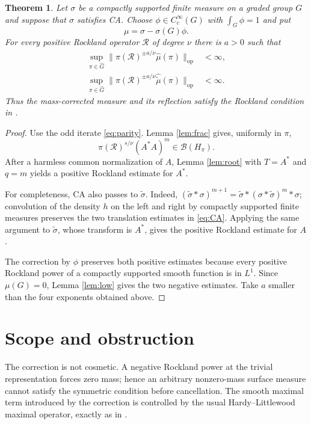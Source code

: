 \documentclass[11pt]{article}
\newtheorem{theorem}{Theorem}
\newcommand{\Rcal}{\mathcal R}
\newcommand{\wideG}{\widehat G}
\newcommand{\op}{\mathrm{op}}
\begin{document}
\begin{theorem}\label{thm:main}
Let $\sigma$ be a compactly supported finite measure on a graded group $G$
and suppose that $\sigma$ satisfies CA.  Choose
$\phi\in C_c^\infty(G)$ with $\int_G\phi=1$ and put
\[
 \mu=\sigma-\sigma(G)\phi.
\]
For every positive Rockland operator $\Rcal$ of degree $\nu$ there is $a>0$
such that
\begin{align*}
 \sup_{\pi\in\wideG}
 \|\pi(\Rcal)^{\pm a/\nu}\widehat\mu(\pi)\|_{\op}&<\infty,\\
 \sup_{\pi\in\wideG}
 \|\pi(\Rcal)^{\pm a/\nu}\widehat{\widetilde\mu}(\pi)\|_{\op}&<\infty.
\end{align*}
Thus the mass-corrected measure and its reflection satisfy the Rockland
condition in \cite{CDR}.
\end{theorem}
\begin{proof}
Use the odd iterate \eqref{eq:parity}.  Lemma \ref{lem:frac} gives, uniformly
in $\pi$,
\[
 \pi(\Rcal)^{s/\nu}(A^*A)^m\in\mathcal B(H_\pi).
\]
After a harmless common normalization of $A$, Lemma \ref{lem:root} with
$T=A^*$ and $q=m$ yields a positive Rockland estimate for $A^*$.

For completeness, CA also passes to $\widetilde\sigma$.  Indeed,
$(\widetilde\sigma*\sigma)^{m+1}
=\widetilde\sigma*(\sigma*\widetilde\sigma)^m*\sigma$; convolution of the
density $h$ on the left and right by compactly supported finite measures
preserves the two translation estimates in \eqref{eq:CA}.  Applying the same
argument to $\widetilde\sigma$, whose transform is $A^*$, gives the positive
Rockland estimate for $A$.

The correction by $\phi$ preserves both positive estimates because every
positive Rockland power of a compactly supported smooth function is in
$L^1$.  Since $\mu(G)=0$, Lemma \ref{lem:low} gives the two negative
estimates.  Take $a$ smaller than the four exponents obtained above.
\end{proof}

\section{Scope and obstruction}

The correction is not cosmetic.  A negative Rockland power at the trivial
representation forces zero mass; hence an arbitrary nonzero-mass surface
measure cannot satisfy the symmetric condition before cancellation.  The
smooth maximal term introduced by the correction is controlled by the usual
Hardy--Littlewood maximal operator, exactly as in \cite{GHW}.
\end{document}

